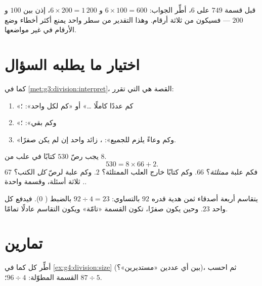 \begin{example}\label{ex:g4:division:size}
قبل قسمة $749$ على $6$، أطِّر الجواب:
$6 \times 100 = 600$ و $6 \times 200 = 1\,200$، إذن 
بين $100$ و $200$ --- فسيكون من ثلاثة أرقام. وهذا التقدير من سطر
واحد يمنع أكثر أخطاء وضع الأرقام في غير مواضعها.
\end{example}

\section{اختيار ما يطلبه السؤال}

\begin{method}\label{met:g4:division:interpret}
كما في \cref{met:g3:division:interpret}، القصة هي التي تقرر:
\begin{enumerate}
  \item «كم عددًا كاملًا \dots» أو «كم لكل واحد»: ؛
  \item «وكم بقي»: ؛
  \item «وكم وعاءً يلزم للجميع»: ، زائد
        واحد إن لم يكن  صفرًا.
\end{enumerate}
\end{method}

\begin{example}\label{ex:g4:division:problem}
يجب رصّ $530$ كتابًا في علب من $8$.
\[
530 = 8 \times 66 + 2 .
\]
فكم علبة \emph{ممتلئة}؟ $66$. وكم كتابًا خارج العلب
الممتلئة؟ $2$. وكم علبة لرصّ \emph{كل} الكتب؟ $67$.
ثلاثة أسئلة، وقسمة واحدة.
\end{example}

\begin{example}\label{ex:g4:division:money}
يتقاسم أربعة أصدقاء ثمن هدية قدره $92$ بالتساوي:
$92 \div 4 = 23$ بالضبط ( $0$). فيدفع كل واحد $23$. وحين
يكون  صفرًا، تكون القسمة «تامّة» ويكون التقاسم عادلًا
تمامًا.
\end{example}

\section{تمارين}

\begin{exercise}[$\star$]\label{exo:g4:division:1}
أطِّر كل  كما في \cref{ex:g4:division:size} (بين أي
عددين «مستديرين»؟)، ثم احسب القسمة المطوّلة:
$96 \div 4$؛ \quad $87 \div 5$.
\end{exercise}

